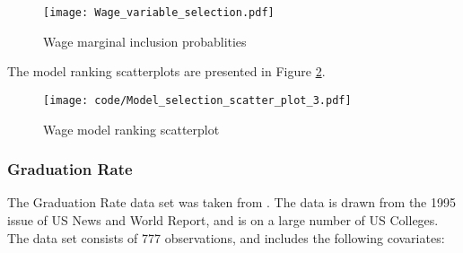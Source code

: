 \documentclass{amsart}[12pt]
\begin{document}
\begin{figure}[p]
	\texttt{[image: Wage\_variable\_selection.pdf]}
	\caption{Wage marginal inclusion probablities}
	\label{fig:Wage_inclusion}
\end{figure}

The model ranking scatterplots are presented in Figure \ref{fig:Wage_model_ranking}.

\begin{figure}[p]
	\texttt{[image: code/Model\_selection\_scatter\_plot\_3.pdf]}
	\caption{Wage model ranking scatterplot}
	\label{fig:Wage_model_ranking}
\end{figure}


\subsubsection{Graduation Rate}

The Graduation Rate data set was taken from \citep{James:2014:ISL:2517747}. The data is drawn from the 1995
issue of US News and World Report, and is on a large number of US Colleges. The data set consists of 777
observations, and includes the following covariates:
\end{document}
